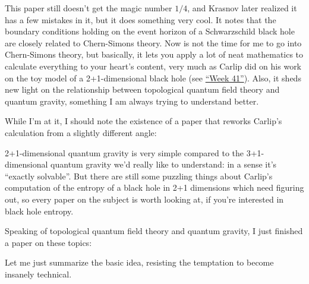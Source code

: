 \documentclass{article}
\def\tightlist{}
\renewcommand{\texttt}[1]{%
  \begingroup
  \ttfamily
  \begingroup\lccode`~=`/\lowercase{\endgroup\def~}{/\discretionary{}{}{}}%
  \begingroup\lccode`~=`[\lowercase{\endgroup\def~}{[\discretionary{}{}{}}%
  \begingroup\lccode`~=`.\lowercase{\endgroup\def~}{.\discretionary{}{}{}}%
  \catcode`/=\active\catcode`[=\active\catcode`.=\active
  \scantokens{#1\noexpand}%
  \endgroup
}
\begin{document}
This paper still doesn't get the magic number \(1/4\), and Krasnov later
realized it has a few mistakes in it, but it does something very cool.
It notes that the boundary conditions holding on the event horizon of a
Schwarzschild black hole are closely related to Chern-Simons theory. Now
is not the time for me to go into Chern-Simons theory, but basically, it
lets you apply a lot of neat mathematics to calculate everything to your
heart's content, very much as Carlip did on his work on the toy model of
a 2+1-dimensional black hole (see \protect\hyperlink{week41}{``Week
41''}). Also, it sheds new light on the relationship between topological
quantum field theory and quantum gravity, something I am always trying
to understand better.

While I'm at it, I should note the existence of a paper that reworks
Carlip's calculation from a slightly different angle:


2+1-dimensional quantum gravity is very simple compared to the
3+1-dimensional quantum gravity we'd really like to understand: in a
sense it's ``exactly solvable''. But there are still some puzzling
things about Carlip's computation of the entropy of a black hole in 2+1
dimensions which need figuring out, so every paper on the subject is
worth looking at, if you're interested in black hole entropy.

Speaking of topological quantum field theory and quantum gravity, I just
finished a paper on these topics:


Let me just summarize the basic idea, resisting the temptation to become
insanely technical.
\end{document}
